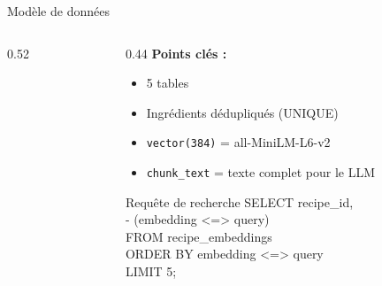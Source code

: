 \documentclass[aspectratio=169]{beamer}
\begin{document}
\begin{frame}{Mod\`ele de donn\'ees}
\begin{columns}[T]
\begin{column}{0.52\textwidth}
{%
}
\end{column}
\begin{column}{0.44\textwidth}
  \textbf{Points cl\'es :}
  \vspace{0.3cm}
  \begin{itemize}\footnotesize
    \item[\textcolor{cprimary}{\textbullet}] 5 tables 
    \item[\textcolor{cprimary}{\textbullet}] Ingr\'edients d\'edupliqu\'es (UNIQUE)
    \item[\textcolor{cgreen}{\textbullet}] \texttt{vector(384)} = all-MiniLM-L6-v2
    \item[\textcolor{corange}{\textbullet}] \texttt{chunk\_text} = texte complet pour le LLM
  \end{itemize}
  \vspace{0.4cm}
  \begin{block}{\scriptsize Requ\^ete de recherche}
  \vspace{0.1cm}
  {\ttfamily\tiny
  SELECT recipe\_id,\\
   - (embedding <=> query)\\
  FROM recipe\_embeddings\\
  ORDER BY embedding <=> query\\
  LIMIT 5;
  }
  \end{block}
\end{column}
\end{columns}
\end{frame}

\end{document}
